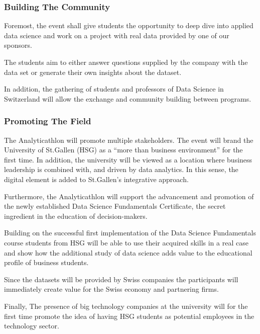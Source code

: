 \documentclass[11pt,a4paper,notitlepage]{article}
\begin{document}
\subsubsection*{Building The Community}
Foremost, the event shall give students the opportunity to deep dive into applied data science and work on a project with real data provided by one of our sponsors.

The students aim to either answer questions supplied by the company with the data set or generate their own insights about the dataset.

In addition, the gathering of students and professors of Data Science in Switzerland will allow the exchange and community building between programs. 

\subsubsection*{Promoting The Field}
The Analyticathlon will promote multiple stakeholders. The event will brand the University of St.Gallen (HSG) as a “more than business environment” for the first time. In addition, the university will be viewed as a location where business leadership is combined with, and driven by data analytics. In this sense, the digital element is added to St.Gallen's integrative approach.

Furthermore, the Analyticathlon will support the advancement and promotion of the newly established Data Science Fundamentals Certificate, the secret ingredient in the education of decision-makers.

Building on the successful first implementation of the Data Science Fundamentals course students from HSG will be able to use their acquired skills in a real case and show how the additional study of data science adds value to the educational profile of business students.

Since the datasets will be provided by Swiss companies the participants will immediately create value for the Swiss economy and partnering firms.

Finally, The presence of big technology companies at the university will for the first time promote the idea of having HSG students as potential employees in the technology sector.
\end{document}
